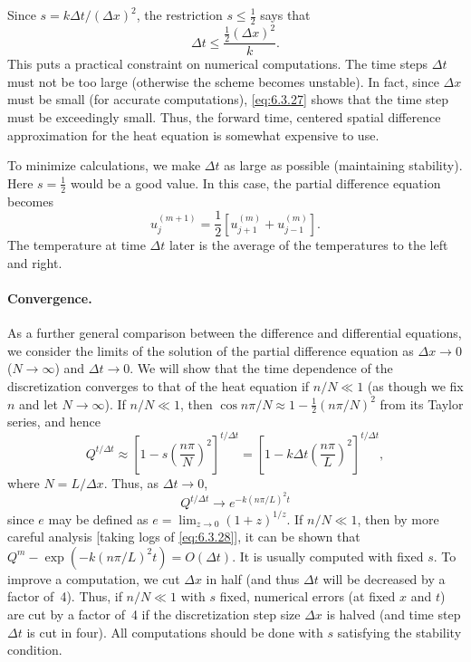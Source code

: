 Since $s = k\Delta t/(\Delta x)^2$, the restriction $s \le \frac{1}{2}$ says that
\begin{equation}
\Delta t \le \frac{\frac{1}{2}(\Delta x)^2}{k}.
\label{eq:6.3.27}
\end{equation}
This puts a practical constraint on numerical computations.  The time steps $\Delta t$ must not be too large (otherwise the scheme becomes unstable).  In fact, since $\Delta x$ must be small (for accurate computations), \eqref{eq:6.3.27} shows that the time step must be exceedingly small.  Thus, the forward time, centered spatial difference approximation for the heat equation is somewhat expensive to use.

To minimize calculations, we make $\Delta t$ as large as possible (maintaining stability).  Here $s = \frac{1}{2}$ would be a good value.  In this case, the partial difference equation becomes
\[
u_j^{(m+1)} = \frac{1}{2}\left[u_{j+1}^{(m)} + u_{j-1}^{(m)}\right].
\]
The temperature at time $\Delta t$ later is the average of the temperatures to the left and right.

\paragraph{Convergence.}
As a further general comparison between the difference and differential equations, we consider the limits of the solution of the partial difference equation as $\Delta x \to 0$ ($N \to \infty$) and $\Delta t \to 0$.  We will show that the time dependence of the discretization converges to that of the heat equation if $n/N \ll 1$ (as though we fix $n$ and let $N \to \infty$).  If $n/N \ll 1$, then $\cos n\pi/N \approx 1 - \frac{1}{2}(n\pi/N)^2$ from its Taylor series, and hence
\begin{equation}
Q^{t/\Delta t} \approx \left[1 - s\left(\frac{n\pi}{N}\right)^2\right]^{t/\Delta t} = \left[1 - k\Delta t\left(\frac{n\pi}{L}\right)^2\right]^{t/\Delta t},
\label{eq:6.3.28}
\end{equation}
where $N = L/\Delta x$.  Thus, as $\Delta t \to 0$,
\begin{equation}
Q^{t/\Delta t} \to e^{-k(n\pi/L)^2 t}
\label{eq:6.3.29}
\end{equation}
since $e$ may be defined as $e = \lim_{z\to 0}(1+z)^{1/z}$.  If $n/N \ll 1$, then by more careful analysis [taking logs of \eqref{eq:6.3.28}], it can be shown that $Q^m - \exp(-k(n\pi/L)^2 t) = O(\Delta t)$.  It is usually computed with fixed $s$.  To improve a computation, we cut $\Delta x$ in half (and thus $\Delta t$ will be decreased by a factor of~4).  Thus, if $n/N \ll 1$ with $s$ fixed, numerical errors (at fixed $x$ and $t$) are cut by a factor of~4 if the discretization step size $\Delta x$ is halved (and time step $\Delta t$ is cut in four).  All computations should be done with $s$ satisfying the stability condition.

